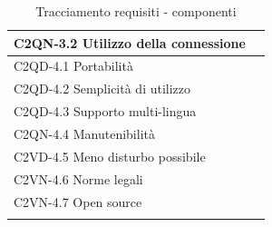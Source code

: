 \begin{footnotesize}
\begin{longtable}[!h]{|l|l|}
C2QN-3.2 Utilizzo della connessione \\ \hline 
C2QD-4.1 Portabilit\`a \\ \hline
C2QD-4.2 Semplicit\`a di utilizzo \\ \hline
C2QD-4.3 Supporto multi-lingua \\ \hline
C2QN-4.4 Manutenibilit\`a \\ \hline
C2VD-4.5 Meno disturbo possibile \\ \hline
C2VN-4.6 Norme legali \\ \hline
C2VN-4.7 Open source \\ \hline
\caption{Tracciamento requisiti - componenti}
\end{longtable}
\end{footnotesize}

\listoftables
{}
\listoffigures
{}

